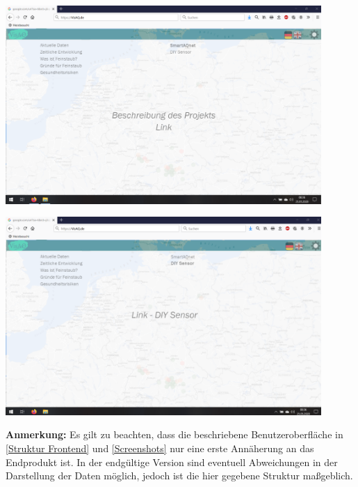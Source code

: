 \begin{center}
	\includegraphics[width=0.9\textwidth]{Screenshots/SmartAQnet} 
	
	\includegraphics[width=0.9\textwidth]{Screenshots/DIY} 
\end{center}

\textbf{Anmerkung:}
Es gilt zu beachten, dass die beschriebene Benutzeroberfläche in \autoref{Struktur Frontend} und \autoref{Screenshots} nur eine erste Annäherung an das Endprodukt ist. In der endgültige Version sind eventuell Abweichungen in der Darstellung der Daten möglich, jedoch ist die hier gegebene Struktur maßgeblich.
